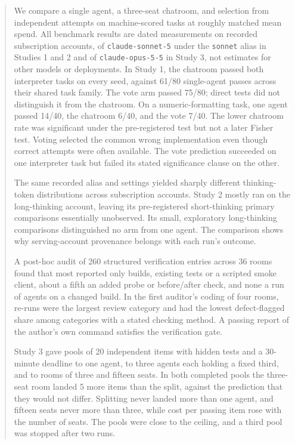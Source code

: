 \begin{abstract}
We compare a single agent, a three-seat chatroom, and selection from independent attempts on machine-scored tasks at roughly matched mean spend. All benchmark results are dated measurements on recorded subscription accounts, of \texttt{claude-sonnet-5} under the \texttt{sonnet} alias in Studies 1 and 2 and of \texttt{claude-opus-5-5} in Study 3, not estimates for other models or deployments. In Study 1, the chatroom passed both interpreter tasks on every seed, against 61/80 single-agent passes across their shared task family. The vote arm passed 75/80; direct tests did not distinguish it from the chatroom. On a numeric-formatting task, one agent passed 14/40, the chatroom 6/40, and the vote 7/40. The lower chatroom rate was significant under the pre-registered test but not a later Fisher test. Voting selected the common wrong implementation even though correct attempts were often available. The vote prediction succeeded on one interpreter task but failed its stated significance clause on the other.

The same recorded alias and settings yielded sharply different thinking-token distributions across subscription accounts. Study 2 mostly ran on the long-thinking account, leaving its pre-registered short-thinking primary comparisons essentially unobserved. Its small, exploratory long-thinking comparisons distinguished no arm from one agent. The comparison shows why serving-account provenance belongs with each run's outcome.

A post-hoc audit of 260 structured verification entries across 36 rooms found that most reported only builds, existing tests or a scripted smoke client, about a fifth an added probe or before/after check, and none a run of agents on a changed build. In the first auditor's coding of four rooms, re-runs were the largest review category and had the lowest defect-flagged share among categories with a stated checking method. A passing report of the author's own command satisfies the verification gate.

Study 3 gave pools of 20 independent items with hidden tests and a 30-minute deadline to one agent, to three agents each holding a fixed third, and to rooms of three and fifteen seats. In both completed pools the three-seat room landed 5 more items than the split, against the prediction that they would not differ. Splitting never landed more than one agent, and fifteen seats never more than three, while cost per passing item rose with the number of seats. The pools were close to the ceiling, and a third pool was stopped after two runs.
\end{abstract}
